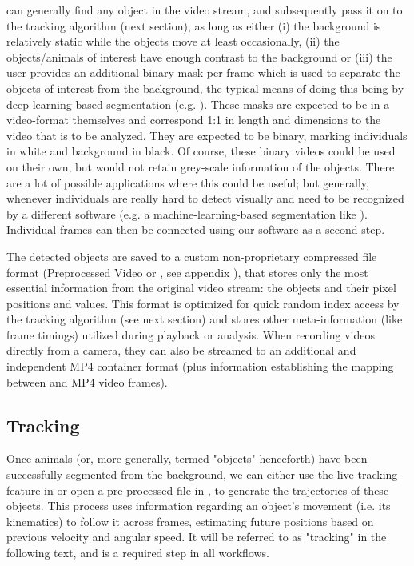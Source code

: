\documentclass[9pt,lineno]{elife}
\newcommand{\TRex}{\protect\path{TRex}}
\newcommand{\TGrabs}{\protect\path{TGrabs}}
\newcommand{\changemade}[1]{#1}
\begin{document}
\changemade{\TGrabs{} can generally find any object in the video stream, and subsequently pass it on to the tracking algorithm (next section),} as long as either (i) the background is relatively static while the objects move at least occasionally, (ii) the objects/animals of interest have enough contrast to the background or (iii) the user provides an additional binary mask per frame which is used to separate the objects \changemade{of interest} from the background, the typical means of doing this being by deep-learning based segmentation (e.g. \citealt{Cae+17}). These masks are expected to be in a video-format themselves and correspond 1:1 in length and dimensions to the video that is to be analyzed. They are expected to be binary, marking individuals in white and background in black. Of course, these binary videos could be \changemade{used} on their own, but would not retain grey-scale information \changemade{of the objects}. There are a lot of possible applications where this could be useful; but generally, whenever individuals are really hard to detect visually and need to be recognized by a different software (e.g. a machine-learning-based \changemade{segmentation} like \citealt{Man+18b}). Individual frames can then be connected using our software as a second step.

The detected objects are saved to a custom non-proprietary compressed file format (Preprocessed Video or \protect{}, see appendix ), that stores only the most essential information from the original video stream: the objects and their pixel positions and values. This format is optimized for quick random index access by the tracking \changemade{algorithm (see next section)} and stores other meta-information (like frame timings) utilized during playback or analysis. When recording videos directly from a camera, they can also be streamed to an additional and independent MP4 container format (plus information establishing the mapping between \protect{} and MP4 video frames).

\subsection{Tracking} \label{sec:tracking}

Once animals (or, more generally, termed "objects" henceforth) have been successfully segmented from the background, we can either use the live-tracking feature in \TGrabs{} or open a pre-processed file in \TRex{}, to generate the trajectories of these objects. This process uses information regarding an object's movement (i.e. its kinematics) to follow it across frames, estimating future positions based on previous velocity and angular speed. It will be referred to as "tracking" in the following text, and is a required step in all workflows.
\end{document}
